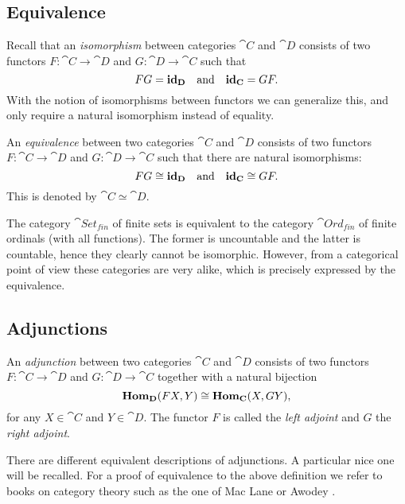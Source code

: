 \subsection{Equivalence}
Recall that an \emph{isomorphism} between categories $\cat{C}$ and $\cat{D}$ consists of two functors $F:\cat{C} \to \cat{D}$ and $G: \cat{D} \to \cat{C}$ such that
$$ FG = \mathbf{id}_{\mathbf{D}} \quad\text{and}\quad \mathbf{id}_{\mathbf{C}} = GF. $$
With the notion of isomorphisms between functors we can generalize this, and only require a natural isomorphism instead of equality.

\begin{definition}
	An \emph{equivalence} between two categories $\cat{C}$ and $\cat{D}$ consists of two functors $F:\cat{C} \to \cat{D}$ and $G: \cat{D} \to \cat{C}$ such that there are natural isomorphisms:
	$$ FG \cong \mathbf{id}_{\mathbf{D}} \quad\text{and}\quad \mathbf{id}_{\mathbf{C}} \cong GF. $$
	This is denoted by $\cat{C} \simeq \cat{D}$.
\end{definition}

\begin{example}
	The category $\cat{Set_{fin}}$ of finite sets is equivalent to the category $\cat{Ord_{fin}}$ of finite ordinals (with all functions). The former is uncountable and the latter is countable, hence they clearly cannot be isomorphic. However, from a categorical point of view these categories are very alike, which is precisely expressed by the equivalence.
\end{example}

\subsection{Adjunctions}
\begin{definition}
	An \emph{adjunction} between two categories $\cat{C}$ and $\cat{D}$ consists of two functors $F:\cat{C} \to \cat{D}$ and $G: \cat{D} \to \cat{C}$ together with a natural bijection
	$$ \mathbf{Hom}_{\mathbf{D}}(FX, Y) \cong \mathbf{Hom}_{\mathbf{C}}(X, GY), $$
	for any $X \in \cat{C}$ and $Y \in \cat{D}$. The functor $F$ is called the \emph{left adjoint} and $G$ the \emph{right adjoint}.
\end{definition}

There are different equivalent descriptions of adjunctions. A particular nice one will be recalled. For a proof of equivalence to the above definition we refer to books on category theory such as the one of Mac Lane \cite{maclane} or Awodey \cite{awodey}.

